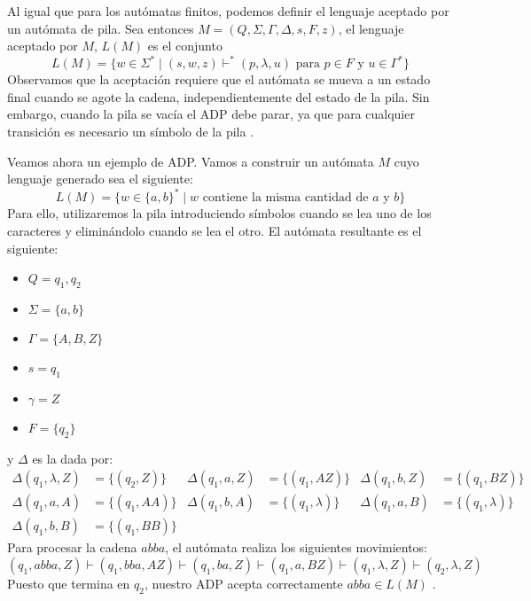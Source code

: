 \vspace{10pt}
Al igual que para los autómatas finitos, podemos definir el lenguaje aceptado por un autómata de pila. Sea entonces
$M=(Q,\Sigma,\Gamma,\Delta,s,F,z)$, el lenguaje aceptado por $M$, $L(M)$ es el conjunto
\begin{equation}
    L(M)=\{w\in\Sigma^*\mid (s,w,z)\vdash^*(p,\lambda,u)\text{ para }p\in F\text{ y }u\in\Gamma^*\}
\end{equation}
Observamos que la aceptación requiere que el autómata se mueva a un estado final cuando se agote la cadena, 
independientemente del estado de la pila. Sin embargo, cuando la pila se vacía el ADP debe parar, ya que para cualquier
transición es necesario un símbolo de la pila \cite{kelley_2001}.

\vspace{10pt}
Veamos ahora un ejemplo de ADP. Vamos a construir un autómata $M$ cuyo lenguaje generado sea el siguiente:
\begin{equation}
    L(M)=\{w\in\{a,b\}^*\mid w\text{ contiene la misma cantidad de }a\text{ y }b\}
\end{equation}
Para ello, utilizaremos la pila introduciendo símbolos cuando se lea uno de los caracteres y eliminándolo cuando se
lea el otro. El autómata resultante es el siguiente:
\begin{itemize}
    \item $Q={q_1,q_2}$
    \item $\Sigma=\{a,b\}$
    \item $\Gamma=\{A,B,Z\}$
    \item $s=q_1$
    \item $\gamma=Z$
    \item $F=\{q_2\}$
\end{itemize}
y $\Delta$ es la dada por:
\begin{align}
    \Delta(q_1,\lambda,Z)&=\{(q_2,Z)\} & \Delta(q_1,a,Z)&=\{(q_1,AZ)\} & \Delta(q_1,b,Z)&=\{(q_1,BZ)\} & \\
    \Delta(q_1,a,A)&=\{(q_1,AA)\} & \Delta(q_1,b,A)&=\{(q_1,\lambda)\} & \Delta(q_1,a,B)&=\{(q_1,\lambda)\} \\\Delta(q_1,b,B)&=\{(q_1,BB)\}
\end{align}
Para procesar la cadena $abba$, el autómata realiza los siguientes movimientos:
\begin{equation}
    (q_1,abba,Z)\vdash(q_1,bba,AZ)\vdash(q_1,ba,Z)\vdash(q_1,a,BZ)\vdash(q_1,\lambda,Z)\vdash(q_2,\lambda,Z)
\end{equation}
Puesto que termina en $q_2$, nuestro ADP acepta correctamente $abba\in L(M)$ \cite{kelley_2001}.

